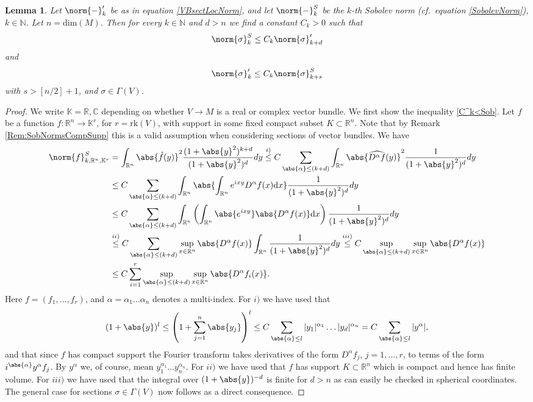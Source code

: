 \documentclass[12pt,a4paper]{article}
\theoremstyle{plain}
\newtheorem{lemma}[theorem]{Lemma}
\theoremstyle{definition}
\newcommand{\R}{\mathbb{R}}
\newcommand{\N}{\mathbb{N}}
\newcommand{\K}{\mathbb{K}}
\newcommand{\nnorm}[2]{\norm{#1}_{#2}}
\renewcommand{\d}{\mathrm{d}}
\begin{document}
\begin{lemma}
\label{Lemma:SobolevVsC^k}
Let $\nnorm{-}{k}'$ be as in equation \eqref{VBsectLocNorm}, and let $\nnorm{-}{k}^S$ be the $k$-th Sobolev norm (cf.~equation \eqref{SobolevNorm}), $k\in \N$. Let $n=\mathrm{dim}(M)$. Then for every $k\in \N$ and $d>n$ we find a constant $C_k>0$ such that 
\begin{align}
\label{C^k<Sob}
    \nnorm{\sigma}{k}^S\leq C_k\nnorm{\sigma}{k+d}' 
\end{align}
and
\begin{align}
\label{Sob<C^k}
    \nnorm{\sigma}{k}' \leq C_k\nnorm{\sigma}{k+s}^S
\end{align}
with $s>[n/2]+1$, and $\sigma \in \Gamma(V)$.
\end{lemma}
\begin{proof}
We write $\K=\R,\mathbb C$ depending on whether $V\to M$ is a real or complex vector bundle.
We first show the inequality \eqref{C^k<Sob}. Let $f$ be a function $f:\R^n\to \K^r$, for $r=\mathrm{rk}(V)$, with support in some fixed compact subset $K\subset \R^n$. Note that by Remark \ref{Rem:SobNormsCompSupp} this is a valid assumption when considering sections of vector bundles. We have
\begin{align*}
    \nnorm{f}{k,\R^n,\K^r}^S&=\int_{\R^n}\abs{\hat f(y)}^2\frac{(1+\abs{y}^2)^{k+d}}{(1+\abs{y}^2)^d}dy\stackrel{i)}{\leq} C\sum_{\abs{\alpha}\leq (k+d)}\int_{\R^n}\abs{\widehat{D^\alpha f}(y)}^2\frac{1}{(1+\abs{y}^2)^d}dy\\
    &\leq C\sum_{\abs{\alpha}\leq (k+d)}\int_{\R^n}\abs{\int_{\R^n}e^{ixy}D^\alpha f(x)\d x}\frac{1}{(1+\abs{y}^2)^d}dy\\
    &\leq C\sum_{\abs{\alpha}\leq (k+d)}\int_{\R^n}\left(\int_{\R^n}\abs{e^{ixy}}\abs{D^\alpha f(x)}\d x\right)\frac{1}{(1+\abs{y}^2)^d}dy\\
    &\stackrel{ii)}{\leq} C\sum_{\abs{\alpha}\leq (k+d)}\sup_{x\in \R^n}\abs{D^\alpha f(x)}\int_{\R^n}\frac{1}{(1+\abs{y}^2)^d}dy \stackrel{iii)}{\leq} C\sup_{\abs{\alpha}\leq (k+d)}\sup_{x\in \R^n}\abs{D^\alpha f(x)}\\
    &\leq C \sum_{i=1}^r\sup_{\abs{\alpha}\leq (k+d)}\sup_{x\in \R^n}\abs{D^\alpha f_i(x)}.
\end{align*}
Here $f=(f_1,\ldots,f_r)$, and $\alpha=\alpha_1\ldots \alpha_n$ denotes a multi-index. For $i)$ we have used that 
\begin{equation*}
    (1+\abs{y})^l\leq \left(1+\sum_{j=1}^n \abs{y_j}\right)^l\leq C\sum_{\abs{\alpha}\leq l}|y_1|^{\alpha_1}\ldots|y_d|^{\alpha_n}=C\sum_{\abs{\alpha}\leq l}|y^\alpha|,
\end{equation*}
and that since $f$ has compact support the Fourier transform takes derivatives of the form $D^\alpha f_j$, $j=1,\ldots,r$, to terms of the form $i^{\abs{\alpha}}y^\alpha f_j$. By $y^\alpha$ we, of course, mean $y_1^{\alpha_1}\ldots y_n^{\alpha_n}$.
For $ii)$ we have used that $f$ has support $K\subset \R^n$ which is compact and hence has finite volume. 
For $iii)$ we have used that the integral over $(1+\abs{y})^{-d}$ is finite for $d>n$ as can easily be checked in spherical coordinates.
The general case for sections $\sigma \in \Gamma(V)$ now follows as a direct consequence.


\end{proof}
\end{document}
